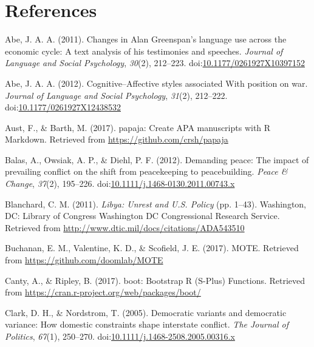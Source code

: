 \documentclass[english,,man]{apa6}
\begin{document}
\newpage

\hypertarget{references}{%
\section{References}\label{references}}

\setlength{\parindent}{-0.5in}
\setlength{\leftskip}{0.5in}

\hypertarget{refs}{}
\leavevmode\hypertarget{ref-Abe2011}{}%
Abe, J. A. A. (2011). Changes in Alan Greenspan's language use across the economic cycle: A text analysis of his testimonies and speeches. \emph{Journal of Language and Social Psychology}, \emph{30}(2), 212--223. doi:\href{https://doi.org/10.1177/0261927X10397152}{10.1177/0261927X10397152}

\leavevmode\hypertarget{ref-Abe2012}{}%
Abe, J. A. A. (2012). Cognitive--Affective styles associated With position on war. \emph{Journal of Language and Social Psychology}, \emph{31}(2), 212--222. doi:\href{https://doi.org/10.1177/0261927X12438532}{10.1177/0261927X12438532}

\leavevmode\hypertarget{ref-Aust2017}{}%
Aust, F., \& Barth, M. (2017). papaja: Create APA manuscripts with R Markdown. Retrieved from \url{https://github.com/crsh/papaja}

\leavevmode\hypertarget{ref-Balas2012}{}%
Balas, A., Owsiak, A. P., \& Diehl, P. F. (2012). Demanding peace: The impact of prevailing conflict on the shift from peacekeeping to peacebuilding. \emph{Peace \& Change}, \emph{37}(2), 195--226. doi:\href{https://doi.org/10.1111/j.1468-0130.2011.00743.x}{10.1111/j.1468-0130.2011.00743.x}

\leavevmode\hypertarget{ref-Blanchard2011}{}%
Blanchard, C. M. (2011). \emph{Libya: Unrest and U.S. Policy} (pp. 1--43). Washington, DC: Library of Congress Washington DC Congressional Research Service. Retrieved from \url{http://www.dtic.mil/docs/citations/ADA543510}

\leavevmode\hypertarget{ref-Buchanan2017}{}%
Buchanan, E. M., Valentine, K. D., \& Scofield, J. E. (2017). MOTE. Retrieved from \url{https://github.com/doomlab/MOTE}

\leavevmode\hypertarget{ref-Canty2017}{}%
Canty, A., \& Ripley, B. (2017). boot: Bootstrap R (S-Plus) Functions. Retrieved from \url{https://cran.r-project.org/web/packages/boot/}

\leavevmode\hypertarget{ref-Clark2005}{}%
Clark, D. H., \& Nordstrom, T. (2005). Democratic variants and democratic variance: How domestic constraints shape interstate conflict. \emph{The Journal of Politics}, \emph{67}(1), 250--270. doi:\href{https://doi.org/10.1111/j.1468-2508.2005.00316.x}{10.1111/j.1468-2508.2005.00316.x}
\end{document}
